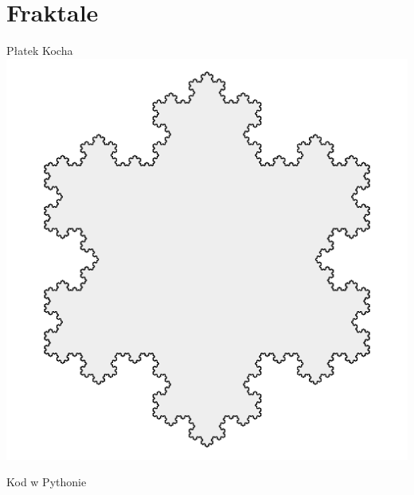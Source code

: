 \section{Fraktale}\label{sec:fractals}
\begin{frame}{Płatek Kocha}
    \centering
    \includegraphics[height=0.8\textheight]{recursion/graphics/koch_snowflake.png}
\end{frame}
\begin{frame}[fragile]{Kod w Pythonie}

\end{frame}


